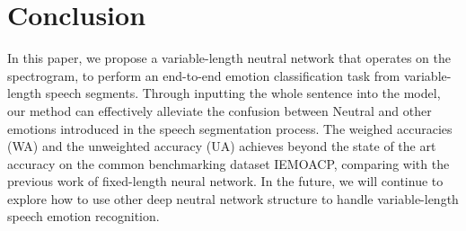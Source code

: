 \documentclass[a4paper]{article}
\begin{document}
\section{Conclusion}
\label{sec:conclusion}

In this paper, we propose a variable-length neutral network that operates on the spectrogram, to perform an end-to-end emotion classification task from variable-length speech segments. Through inputting the whole sentence into the model, our method can effectively alleviate the confusion between Neutral and other emotions introduced in the speech segmentation process. The weighed accuracies (WA) and the unweighted accuracy (UA) achieves beyond the state of the art accuracy on the common benchmarking dataset IEMOACP, comparing with the previous work of fixed-length neural network. In the future, we will continue to explore how to use other deep neutral network structure to handle variable-length speech emotion recognition.

%





\end{document}
